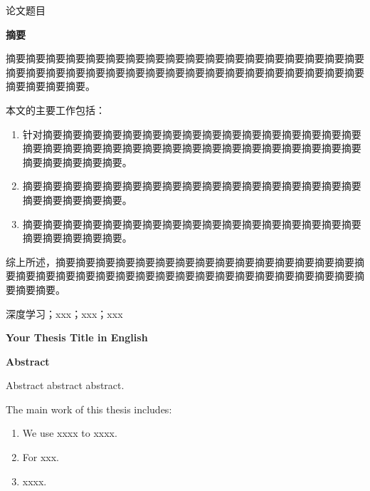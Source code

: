 \documentclass[UTF-8,a4paper,twoside]{article}
\numberwithin{equation}{section} %
\numberwithin{table}{section} %
\numberwithin{figure}{section} %
\renewcommand{\heiti}{\CJKfamily{zhhei}}
\begin{document}
\pagestyle{pre}
\thispagestyle{pre}
\begin{center}
	\heiti{}论文题目
\end{center}
\vspace{\baselineskip}
\begin{center}
	\bfseries{摘要}
\end{center}

摘要摘要摘要摘要摘要摘要摘要摘要摘要摘要摘要摘要摘要摘要摘要摘要摘要摘要摘要摘要摘要摘要摘要摘要摘要摘要摘要摘要摘要摘要摘要摘要摘要摘要摘要摘要摘要摘要摘要摘要。

本文的主要工作包括：

\begin{enumerate}[itemsep=0pt,topsep=0pt]
	\item 针对摘要摘要摘要摘要摘要摘要摘要摘要摘要摘要摘要摘要摘要摘要摘要摘要摘要摘要摘要摘要摘要摘要摘要摘要摘要摘要摘要摘要摘要摘要摘要摘要摘要摘要摘要摘要摘要摘要。
	\item 摘要摘要摘要摘要摘要摘要摘要摘要摘要摘要摘要摘要摘要摘要摘要摘要摘要摘要摘要摘要摘要摘要。
	\item 摘要摘要摘要摘要摘要摘要摘要摘要摘要摘要摘要摘要摘要摘要摘要摘要摘要摘要摘要摘要摘要摘要。
\end{enumerate}

综上所述，摘要摘要摘要摘要摘要摘要摘要摘要摘要摘要摘要摘要摘要摘要摘要摘要摘要摘要摘要摘要摘要摘要摘要摘要摘要摘要摘要摘要摘要摘要摘要摘要摘要摘要摘要摘要。

\noindent{}深度学习；xxx；xxx；xxx

\newpage
\begin{center}
	\bfseries Your Thesis Title in English
\end{center}
\vspace{\baselineskip}

\begin{center}
	\bfseries{Abstract}
\end{center}

Abstract abstract abstract.

The main work of this thesis includes:

\begin{enumerate}[itemsep=0pt,topsep=0pt]
\item We use xxxx to xxxx.
\item For xxx.
\item xxxx.
\end{enumerate}
\end{document}
